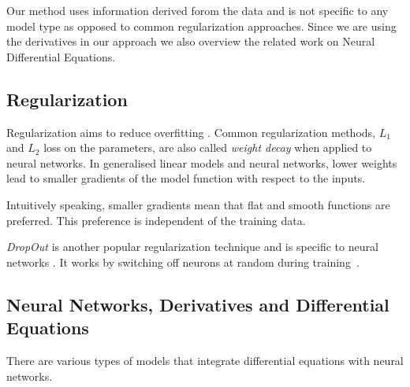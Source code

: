 \documentclass{article}
\newcommand{\kibitz}[2]{\ifnum\Comments=1\textcolor{#1}{#2}\fi}
\newcommand{\kizito}[1]{\kibitz{red} {[Kizito: #1]}}
\newcommand{\enrico}[1]{\kibitz{blue} {[Enrico: #1]}}
\newcommand{\tillman}[1]{\kibitz{darkgreen} {[Tillman: #1]}}
\begin{document}
Our method uses information derived forom the data and is not specific to any model type as opposed to common regularization approaches.
Since we are using the derivatives in our approach we also overview the related work on Neural Differential Equations.

\subsection{Regularization}
Regularization aims to reduce overfitting \cite{Kukacka2017regsurvey}.
Common regularization methods, $L_1$ and $L_2$ loss on the parameters, are also called \emph{weight decay} when applied to neural networks.
In generalised linear models and neural networks, lower weights lead to smaller gradients of the model function with respect to the inputs. 

Intuitively speaking, smaller gradients mean that flat and smooth functions are preferred. 
This preference is independent of the training data.

\emph{DropOut} is another popular regularization technique and is specific to neural networks \cite{baldi2013understanding}.
It works by switching off neurons at random during training~\cite{srivastava2014dropout}. 

\subsection{Neural Networks, Derivatives and Differential Equations} 

There are various types of models that integrate differential equations with neural networks. 

\end{document}
